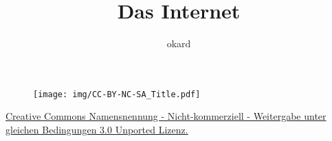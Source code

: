 \documentclass{beamer}
\title{Das Internet}
\author{okard}
\begin{document}
\frame{ \titlepage }


\begin{frame}
\begin{figure}
\centering
\texttt{[image: img/CC-BY-NC-SA\_Title.pdf]}
\end{figure}

\vspace{3em}
\begin{small}
 \href{http://creativecommons.org/licenses/by-nc-sa/3.0/deed.de}{Creative Commons Namensnennung - Nicht-kommerziell - Weitergabe unter gleichen Bedingungen 3.0 Unported Lizenz.}
 

\end{small}





\end{frame}





\end{document}
